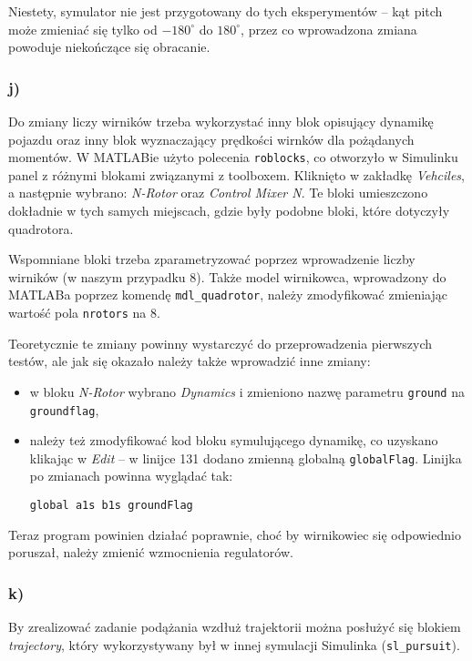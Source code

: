 \documentclass[11pt, a4paper]{article}
\begin{document}
Niestety, symulator nie jest przygotowany do tych eksperymentów -- kąt pitch może zmieniać się tylko od $-180^{\circ}$ do $180^{\circ}$, przez co wprowadzona zmiana powoduje niekończące się obracanie.

\subsubsection*{j)}

Do zmiany liczy wirników trzeba wykorzystać inny blok opisujący dynamikę pojazdu oraz inny blok wyznaczający prędkości wirnków dla pożądanych momentów. W MATLABie użyto polecenia \texttt{roblocks}, co otworzyło w Simulinku panel z różnymi blokami związanymi z toolboxem. Kliknięto w zakładkę \emph{Vehciles}, a następnie wybrano:
\emph{N-Rotor} oraz \emph{Control Mixer N}. Te bloki umieszczono dokładnie w tych samych miejscach, gdzie były podobne bloki, które dotyczyły quadrotora.

Wspomniane bloki trzeba zparametryzować poprzez wprowadzenie liczby wirników (w naszym przypadku 8). Także model wirnikowca, wprowadzony do MATLABa poprzez komendę \texttt{mdl\_quadrotor}, należy zmodyfikować zmieniając wartość pola \texttt{nrotors} na 8.

Teoretycznie te zmiany powinny wystarczyć do przeprowadzenia pierwszych testów, ale jak się okazało należy także wprowadzić inne zmiany:
\begin{itemize}
\item w bloku \emph{N-Rotor} wybrano \emph{Dynamics} i zmieniono nazwę parametru \texttt{ground} na \texttt{groundflag},
\item należy też zmodyfikować kod bloku symulującego dynamikę, co uzyskano klikając w \emph{Edit} -- w linijce 131 dodano zmienną globalną \texttt{globalFlag}. Linijka po zmianach powinna wyglądać tak:
\begin{lstlisting}[firstnumber = 131]
	global a1s b1s groundFlag
\end{lstlisting}
\end{itemize}

Teraz program powinien działać poprawnie, choć by wirnikowiec się odpowiednio poruszał, należy zmienić wzmocnienia regulatorów.

\subsubsection*{k)}

By zrealizować zadanie podążania wzdłuż trajektorii można posłużyć się blokiem \emph{trajectory}, który wykorzystywany był w innej symulacji Simulinka (\texttt{sl\_pursuit}).
\end{document}
